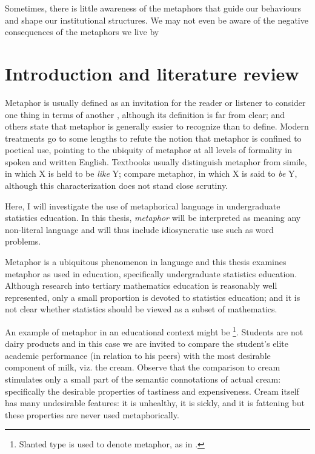 \begin{savequote}[105mm]\begin{singlespace}
Sometimes, there is little awareness of the metaphors that guide our
behaviours and shape our institutional structures.  We may not even be
aware of the negative consequences of the metaphors we live
by\end{singlespace} 
\end{savequote}

\chapter{Introduction and literature review} %
\label{chapter1} %

Metaphor is usually defined as an invitation for the reader or listener to
consider one thing in terms of another \parencite{steen1994}, although
its definition is far from clear;  and others
state that metaphor is generally easier to recognize than to define.  Modern
treatments go to some lengths to refute the notion that metaphor is
confined to poetical use, pointing to the ubiquity of metaphor at all
levels of formality \parencite{deignan2005} in spoken
\parencite{cameron2003} and written \parencite{charteris-black2004}
English.  Textbooks usually distinguish metaphor from simile, in which
X is held to be \emph{like} Y; compare metaphor, in which X is said to
\emph{be} Y, although this characterization does not stand close
scrutiny.

Here, I will investigate the use of metaphorical language in
undergraduate statistics education.  In this thesis, \emph{metaphor}
will be interpreted as meaning any non-literal language and will thus
include idiosyncratic use such as word problems.

Metaphor is a ubiquitous phenomenon in language and this thesis
examines metaphor as used in education, specifically undergraduate
statistics education.  Although research into tertiary mathematics
education is reasonably well represented, only a small proportion is
devoted to statistics education; and it is not clear whether statistics
should be viewed as a subset of mathematics.

An example of metaphor in an educational context might be \footnote{Slanted type
  is used to denote metaphor, as in .}.  Students are not dairy products and in this
case we are invited to compare the student's elite academic
performance (in relation to his peers) with the most desirable
component of milk, viz. the cream. Observe that the comparison to
cream stimulates only a small part of the semantic connotations of
actual cream: specifically the desirable properties of tastiness and
expensiveness.  Cream itself has many undesirable features: it is
unhealthy, it is sickly, and it is fattening but these properties are
never used metaphorically.

